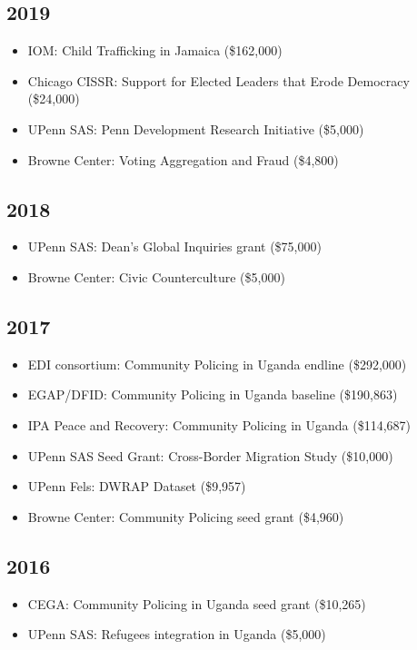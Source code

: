 \documentclass[10pt,a4paper]{article}
\begin{document}
\subsection*{2019}
\begin{itemize}[leftmargin=1em, itemsep=1pt, topsep=2pt, label=\textcolor{secondary}{$\bullet$}]
\item IOM: Child Trafficking in Jamaica (\$162,000)
\item Chicago CISSR: Support for Elected Leaders that Erode Democracy (\$24,000)
\item UPenn SAS: Penn Development Research Initiative (\$5,000)
\item Browne Center: Voting Aggregation and Fraud (\$4,800)
\end{itemize}

\subsection*{2018}
\begin{itemize}[leftmargin=1em, itemsep=1pt, topsep=2pt, label=\textcolor{secondary}{$\bullet$}]
\item UPenn SAS: Dean's Global Inquiries grant (\$75,000)
\item Browne Center: Civic Counterculture (\$5,000)
\end{itemize}

\subsection*{2017}
\begin{itemize}[leftmargin=1em, itemsep=1pt, topsep=2pt, label=\textcolor{secondary}{$\bullet$}]
\item EDI consortium: Community Policing in Uganda endline (\$292,000)
\item EGAP/DFID: Community Policing in Uganda baseline (\$190,863)
\item IPA Peace and Recovery: Community Policing in Uganda (\$114,687)
\item UPenn SAS Seed Grant: Cross-Border Migration Study (\$10,000)
\item UPenn Fels: DWRAP Dataset (\$9,957)
\item Browne Center: Community Policing seed grant (\$4,960)
\end{itemize}

\subsection*{2016}
\begin{itemize}[leftmargin=1em, itemsep=1pt, topsep=2pt, label=\textcolor{secondary}{$\bullet$}]
\item CEGA: Community Policing in Uganda seed grant (\$10,265)
\item UPenn SAS: Refugees integration in Uganda (\$5,000)
\end{itemize}
\end{document}
